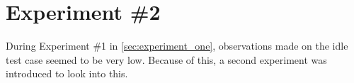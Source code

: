 \section{Experiment \#2}\label{sec:experiment_two}

During Experiment \#1 in \cref{sec:experiment_one}, observations made on the idle test case seemed to be very low. Because of this, a second experiment was introduced to look into this.


